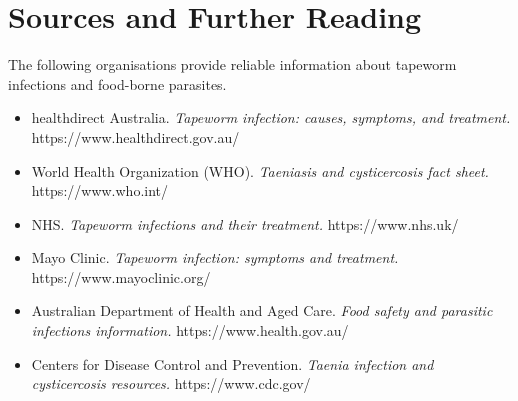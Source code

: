 \section*{Sources and Further Reading}
The following organisations provide reliable information about tapeworm infections and food-borne parasites.

\begin{itemize}
    \item healthdirect Australia. \textit{Tapeworm infection: causes, symptoms, and treatment.} https://www.healthdirect.gov.au/
    \item World Health Organization (WHO). \textit{Taeniasis and cysticercosis fact sheet.} https://www.who.int/
    \item NHS. \textit{Tapeworm infections and their treatment.} https://www.nhs.uk/
    \item Mayo Clinic. \textit{Tapeworm infection: symptoms and treatment.} https://www.mayoclinic.org/
    \item Australian Department of Health and Aged Care. \textit{Food safety and parasitic infections information.} https://www.health.gov.au/
    \item Centers for Disease Control and Prevention. \textit{Taenia infection and cysticercosis resources.} https://www.cdc.gov/
\end{itemize}

\clearpage
